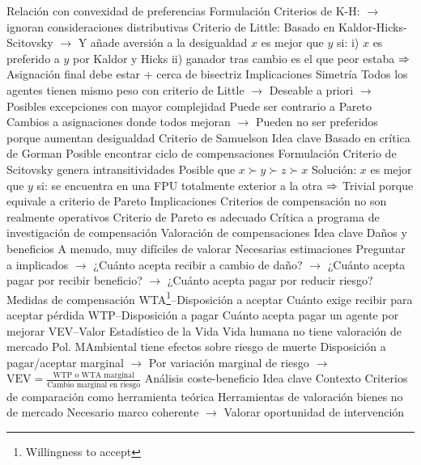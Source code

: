 \documentclass{nuevotema}
\begin{document}
\begin{esquemal}
				\4[] Relación con convexidad de preferencias
			\3 Formulación
				\4 Criterios de K-H:
				\4[] $\to$ ignoran consideraciones distributivas
				\4 Criterio de Little:
				\4[] Basado en Kaldor-Hicks-Scitovsky
				\4[] $\to$ Y añade aversión a la desigualdad
				\4 $x$ es mejor que $y$ si:
				\4[] i) $x$ es preferido a $y$ por Kaldor y Hicks
				\4[] ii) ganador tras cambio es el que peor estaba
				\4[] $\Rightarrow$ Asignación final debe estar + cerca de bisectriz
			\3 Implicaciones
				\4 Simetría
				\4[] Todos los agentes tienen mismo peso con criterio de Little
				\4[] $\to$ Deseable a priori
				\4[] $\to$ Posibles excepciones con mayor complejidad
				\4 Puede ser contrario a Pareto
				\4[] Cambios a asignaciones donde todos mejoran
				\4[] $\to$ Pueden no ser preferidos porque aumentan desigualdad
		\2 Criterio de Samuelson
			\3 Idea clave
				\4 Basado en crítica de Gorman
				\4 Posible encontrar ciclo de compensaciones
			\3 Formulación
				\4 Criterio de Scitovsky genera intransitividades
				\4[] Posible que $x \succ y \succ z \succ x$
				\4 Solución:
				\4[] $x$ es mejor que $y$ si:
				\4[] se encuentra en una FPU totalmente exterior a la otra
				\4[] $\Rightarrow$ Trivial porque equivale a criterio de Pareto
			\3 Implicaciones
				\4 Criterios de compensación no son realmente operativos
				\4 Criterio de Pareto es adecuado
				\4 Crítica a programa de investigación de compensación
		\2 Valoración de compensaciones
			\3 Idea clave
				\4 Daños y beneficios
				\4[] A menudo, muy difíciles de valorar
				\4 Necesarias estimaciones
				\4 Preguntar a implicados
				\4[] $\to$ ¿Cuánto acepta recibir a cambio de daño?
				\4[] $\to$ ¿Cuánto acepta pagar por recibir beneficio?
				\4[] $\to$ ¿Cuánto acepta pagar por reducir riesgo?
			\3 Medidas de compensación
				\4 WTA\footnote{Willingness to accept}--Disposición a aceptar
				\4[] Cuánto exige recibir para aceptar pérdida
				\4 WTP--Disposición a pagar
				\4[] Cuánto acepta pagar un agente por mejorar
				\4 VEV--Valor Estadístico de la Vida
				\4[] Vida humana no tiene valoración de mercado
				\4[] Pol. MAmbiental tiene efectos sobre riesgo de muerte
				\4[] Disposición a pagar/aceptar marginal
				\4[] $\to$ Por variación marginal de riesgo
				\4[] $\to$ $\text{VEV} = \frac{\text{WTP o WTA marginal}}{\text{Cambio marginal en riesgo}}$
		\2 Análisis coste-beneficio
			\3 Idea clave
				\4 Contexto
				\4[] Criterios de comparación como herramienta teórica
				\4[] Herramientas de valoración bienes no de mercado
				\4[] Necesario marco coherente
				\4[] $\to$ Valorar oportunidad de intervención

\end{esquemal}
\end{document}
